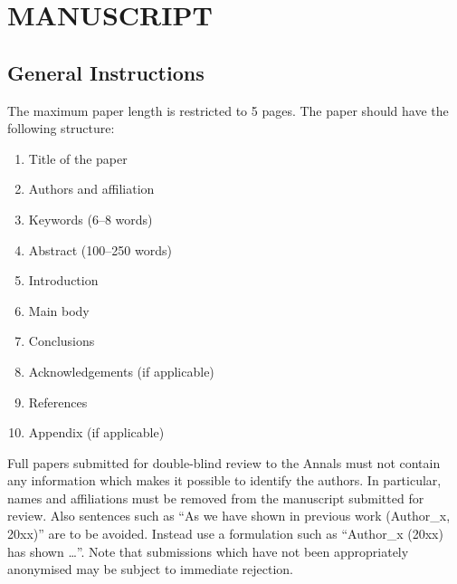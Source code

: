 \documentclass{isprs} %
\begin{document}

\maketitle


\section{MANUSCRIPT}\label{MANUSCRIPT}
 
\sloppy

\subsection{General Instructions}\label{sec:General Instructions}

The maximum paper length is restricted to 5 pages. The paper should have the following structure: 

\begin{enumerate}
\setlength\itemsep{0em}\setlength\parskip{0em}\setlength\topsep{0em}\setlength\partopsep{0em}\setlength\parsep{0em} 
\item{Title of the paper} 
\item{Authors and affiliation}
\item{Keywords (6--8 words)}
\item{Abstract (100--250 words)}
\item{Introduction}
\item{Main body}
\item{Conclusions}
\item{Acknowledgements (if applicable)}
\item{References}
\item{Appendix (if applicable)}
\end{enumerate}

Full papers submitted for double-blind review to the Annals must not contain any information 
which makes it possible to identify the authors. In particular, names and affiliations must be 
removed from the manuscript submitted for review. Also sentences such as ``As we have shown in 
previous work (Author\_x, 20xx)'' are to be avoided. Instead use a formulation such 
as ``Author\_x (20xx) has shown \ldots''. Note that submissions which have not been 
appropriately anonymised may be subject to immediate rejection.
\end{document}
